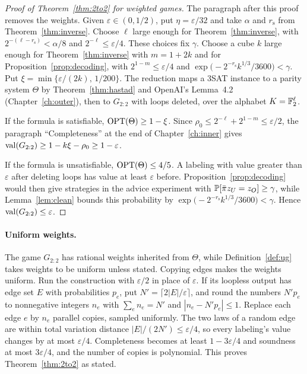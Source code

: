 \begin{proof}[Proof of Theorem~\ref{thm:2to2} for weighted games]
The paragraph after this proof removes the weights. Given $\varepsilon\in(0,1/2)$, put $\eta=\varepsilon/32$ and take $\alpha$ and $r_{\mathrm s}$ from Theorem~\ref{thm:inverse}. Choose $\ell$ large enough for Theorem~\ref{thm:inverse}, with $2^{-(\ell-r_{\mathrm s})}<\alpha/8$ and $2^{-\ell}\le\varepsilon/4$. These choices fix $\gamma$. Choose a cube $k$ large enough for Theorem~\ref{thm:inverse} with $m=1+2k$ and for Proposition~\ref{prop:decoding}, with $2^{1-m}\le\varepsilon/4$ and $\exp\bigl(-2^{-r_{\mathrm s}}k^{1/3}/3600\bigr)<\gamma$. Put $\xi=\min\{\varepsilon/(2k),\,1/200\}$. The reduction maps a 3SAT instance to a parity system $\Theta$ by Theorem~\ref{thm:hastad} and OpenAI's Lemma~4.2 (Chapter~\ref{ch:outer}), then to $G_{2:2}$ with loops deleted, over the alphabet $K=\mathbb{F}_2^\ell$.

If the formula is satisfiable, $\operatorname{OPT}(\Theta)\ge1-\xi$. Since $\rho_0\le2^{-\ell}+2^{1-m}\le\varepsilon/2$, the paragraph ``Completeness'' at the end of Chapter~\ref{ch:inner} gives $\operatorname{val}(G_{2:2})\ge1-k\xi-\rho_0\ge1-\varepsilon$.

If the formula is unsatisfiable, $\operatorname{OPT}(\Theta)\le4/5$. A labeling with value greater than $\varepsilon$ after deleting loops has value at least $\varepsilon$ before. Proposition~\ref{prop:decoding} would then give strategies in the advice experiment with $\mathbb{P}[\bar\pi z_U=z_O]\ge\gamma$, while Lemma~\ref{lem:clean} bounds this probability by $\exp\bigl(-2^{-r_{\mathrm s}}k^{1/3}/3600\bigr)<\gamma$. Hence $\operatorname{val}(G_{2:2})\le\varepsilon$.
\end{proof}

\paragraph{Uniform weights.} The game $G_{2:2}$ has rational weights inherited from $\Theta$, while Definition~\ref{def:ug} takes weights to be uniform unless stated. Copying edges makes the weights uniform. Run the construction with $\varepsilon/2$ in place of $\varepsilon$. If its loopless output has edge set $E$ with probabilities $p_e$, put $N'=\lceil2|E|/\varepsilon\rceil$, and round the numbers $N'p_e$ to nonnegative integers $n_e$ with $\sum_en_e=N'$ and $|n_e-N'p_e|\le1$. Replace each edge $e$ by $n_e$ parallel copies, sampled uniformly. The two laws of a random edge are within total variation distance $|E|/(2N')\le\varepsilon/4$, so every labeling's value changes by at most $\varepsilon/4$. Completeness becomes at least $1-3\varepsilon/4$ and soundness at most $3\varepsilon/4$, and the number of copies is polynomial. This proves Theorem~\ref{thm:2to2} as stated.

